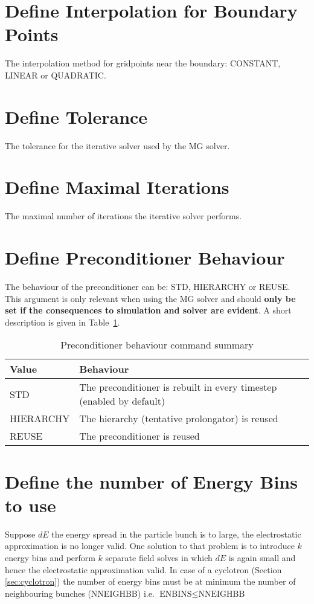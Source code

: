\section{Define Interpolation for Boundary Points}
\label{sec:INTERPL}
The interpolation method for gridpoints near the boundary: CONSTANT, LINEAR or QUADRATIC.

\section{Define Tolerance}
\label{sec:TOL}
The tolerance for the iterative solver used by the MG solver.

\section{Define Maximal Iterations}
\label{sec:MAXITERS}
The maximal number of iterations the iterative solver performs.

\section{Define Preconditioner Behaviour}
\label{sec:PRECMODE}
The behaviour of the preconditioner can be: STD, HIERARCHY or REUSE. This argument is only relevant when using the MG solver and should \textbf{only be set if the consequences to simulation and solver are evident}. A short description is given in Table~\ref{tab:preconditioner_behaviour}.

\begin{table}[ht]
  \begin{center}
    \begin{tabular}{|l|p{}|}
      \hline
      Value & Behaviour \\
      \hline
       STD & The preconditioner is rebuilt in every timestep (enabled by default) \\
       HIERARCHY & The hierarchy (tentative prolongator) is reused \\
       REUSE & The preconditioner is reused \\
      \hline
    \end{tabular}
    \caption{Preconditioner behaviour command summary}
    \label{tab:preconditioner_behaviour}
  \end{center}
\end{table}

\section{Define the number of Energy Bins to use}
\label{sec:FSENBINS}
Suppose $dE$ the energy spread in the particle bunch is to large, the electrostatic approximation is no longer valid. 
One solution to that problem is to introduce  $k$ energy bins  and perform $k$ separate field solves
in which $dE$ is again small and hence the electrostatic approximation valid. In case of a cyclotron 
(Section \ref{sec:cyclotron}) the number of energy bins must be at minimum the number of neighbouring bunches (NNEIGHBB) i.e.  $\text{ENBINS} \le \text{NNEIGHBB}$ 
